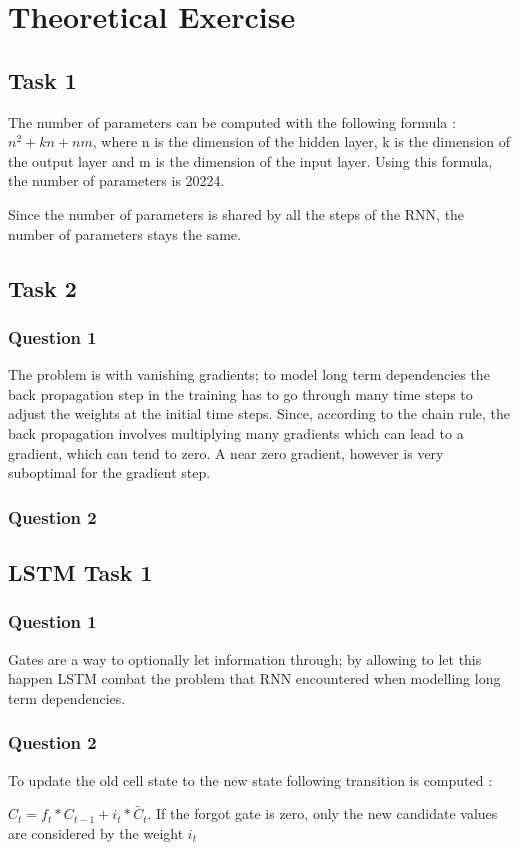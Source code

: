 \documentclass[10pt]{article}
\begin{document}
\section{Theoretical Exercise}
\subsection{Task 1}
The number of parameters can be computed with the following formula : 
$n^2+kn+nm$, where n is the dimension of the hidden layer, k is the dimension of the output layer and m is the dimension of the input layer. Using this formula, the number of parameters is 20224. 

Since the number of parameters is shared by all the steps of the RNN, the number of parameters stays the same.

\subsection{Task 2}
\subsubsection{Question 1}
The problem is with vanishing gradients; to model long term dependencies the back propagation step in the training has to go through many time steps to adjust the weights at the initial time steps. Since, according to the chain rule, the back propagation involves multiplying many gradients which can lead to a gradient, which can tend to zero. A near zero gradient, however is very suboptimal for the gradient step. 
\subsubsection{Question 2}


\subsection{LSTM Task 1 }
\subsubsection{Question 1}
Gates are a way to optionally let information through; by allowing to let this happen LSTM combat the problem that RNN encountered when modelling long term dependencies. 
\subsubsection{Question 2}
To update the old cell state to the new state following transition is computed : 

$C_t = f_t * C_{t-1}+i_t * \widetilde{C_t}$. If the forgot gate is zero, only the new candidate values are considered by the weight $i_t$
\end{document}
